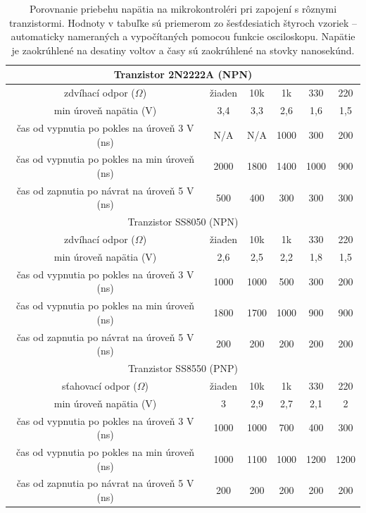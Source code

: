 \begin{table}
    \caption[Porovnanie priebehu napätia pri zapojení s rôznymi tranzistormi]{Porovnanie priebehu napätia na mikrokontroléri pri zapojení s rôznymi tranzistormi. Hodnoty v tabuľke sú priemerom zo šesťdesiatich štyroch vzoriek -- automaticky nameraných a vypočítaných pomocou funkcie osciloskopu. Napätie je zaokrúhlené na desatiny voltov a časy sú zaokrúhlené na stovky nanosekúnd.}
    \label{tab:oscVoltage}
    \begin{center}
    \begin{tabular}{|c|c|c|c|c|c|}
        \hline
        \multicolumn{6}{|c|}{Tranzistor 2N2222A (NPN)} \\
        \hline 
        zdvíhací odpor ($\Omega$) & žiaden & 10k & 1k & 330 & 220 \\
        \hline
        min úroveň napätia (V) & 3,4 & 3,3 & 2,6 & 1,6 & 1,5 \\
        \hline
        čas od vypnutia po pokles na úroveň 3 V (ns) & N/A & N/A & 1000 & 300 & 200 \\
        \hline
        čas od vypnutia po pokles na min úroveň (ns) & 2000 & 1800 & 1400 & 1000 & 900 \\
        \hline
        čas od zapnutia po návrat na úroveň 5 V (ns) & 500 & 400 & 300 & 300 & 300 \\
        \hline
        \multicolumn{6}{|c|}{Tranzistor SS8050 (NPN)} \\
        \hline 
        zdvíhací odpor ($\Omega$) & žiaden & 10k & 1k & 330 & 220 \\
        \hline
        min úroveň napätia (V) & 2,6 & 2,5 & 2,2 & 1,8 & 1,5 \\
        \hline
        čas od vypnutia po pokles na úroveň 3 V (ns) & 1000 & 1000 & 500 & 300 & 200 \\
        \hline
        čas od vypnutia po pokles na min úroveň (ns) & 1800 & 1700 & 1000 & 900 & 900 \\
        \hline
        čas od zapnutia po návrat na úroveň 5 V (ns) & 200 & 200 & 200 & 200 & 200 \\
        \hline
        \multicolumn{6}{|c|}{Tranzistor SS8550 (PNP)} \\
        \hline 
        sťahovací odpor ($\Omega$) & žiaden & 10k & 1k & 330 & 220 \\
        \hline
        min úroveň napätia (V) & 3 & 2,9 & 2,7 & 2,1 & 2 \\
        \hline
        čas od vypnutia po pokles na úroveň 3 V (ns) & 1000 & 1000 & 700 & 400 & 300 \\
        \hline
        čas od vypnutia po pokles na min úroveň (ns) & 1000 & 1100 & 1000 & 1200 & 1200 \\
        \hline
        čas od zapnutia po návrat na úroveň 5 V (ns) & 200 & 200 & 200 & 200 & 200 \\
        \hline
    \end{tabular}
    \end{center}
\end{table}

